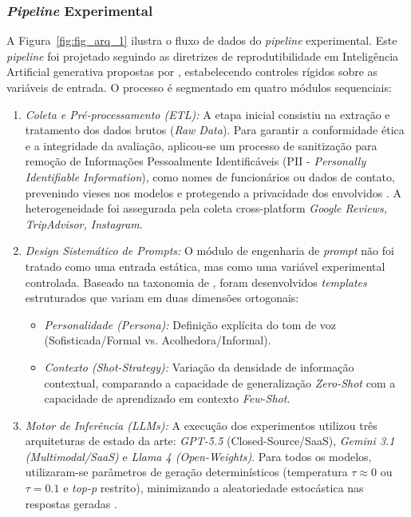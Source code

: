 \documentclass[12pt, a4paper]{article}
\numberwithin{equation}{section}
\begin{document}
\subsubsection{\textit{Pipeline} Experimental}

A Figura~\ref{fig:fig_arq_1} ilustra o fluxo de dados do \textit{pipeline} experimental. Este \textit{pipeline} foi projetado seguindo as diretrizes de reprodutibilidade em Inteligência Artificial generativa propostas por , estabelecendo controles rígidos sobre as variáveis de entrada. O processo é segmentado em quatro módulos sequenciais:

\begin{enumerate}
    \item \textit{Coleta e Pré-processamento (\textit{ETL}):} 
    A etapa inicial consistiu na extração e tratamento dos dados brutos (\textit{Raw Data}). Para garantir a conformidade ética e a integridade da avaliação, aplicou-se um processo de sanitização para remoção de Informações Pessoalmente Identificáveis (PII - \textit{Personally Identifiable Information}), como nomes de funcionários ou dados de contato, prevenindo vieses nos modelos e protegendo a privacidade dos envolvidos \cite{brown2020language}. A heterogeneidade foi assegurada pela coleta cross-platform \textit{Google Reviews, TripAdvisor, Instagram}.

    \item \textit{Design Sistemático de \textit{Prompts}:} 
    O módulo de engenharia de \textit{prompt} não foi tratado como uma entrada estática, mas como uma variável experimental controlada. Baseado na taxonomia de , foram desenvolvidos \textit{templates} estruturados que variam em duas dimensões ortogonais:
    \begin{itemize}
        \item \textit{Personalidade (Persona):} Definição explícita do tom de voz (Sofisticada/Formal vs. Acolhedora/Informal).
        \item \textit{Contexto (\textit{Shot-Strategy}):} Variação da densidade de informação contextual, comparando a capacidade de generalização \textit{Zero-Shot} com a capacidade de aprendizado em contexto \textit{Few-Shot}.
    \end{itemize}

    \item \textit{Motor de Inferência (\textit{LLMs}):} 
    A execução dos experimentos utilizou três arquiteturas de estado da arte: \textit{GPT-5.5} (Closed-Source/SaaS), \textit{Gemini 3.1 (Multimodal/SaaS)} e \textit{Llama 4 (Open-Weights)}. Para todos os modelos, utilizaram-se parâmetros de geração determinísticos (temperatura $\tau \approx 0$ ou $\tau=0.1$ e \textit{top-p} restrito), minimizando a aleatoriedade estocástica nas respostas geradas \cite{zhao2023Survey}.
    

\end{enumerate}
\end{document}
